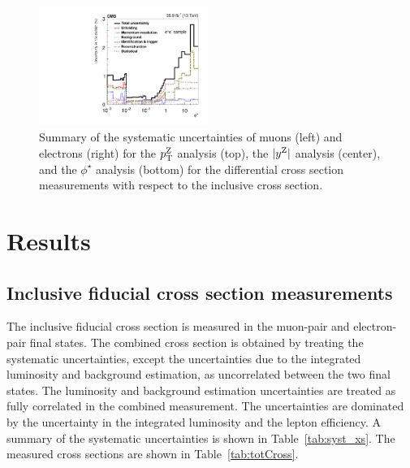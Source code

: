 \begin{figure}
        \includegraphics[width=0.49\textwidth]{figures/zpt/histoUnfolding_XSRatioSystPhiStar_nsel1_dy3.pdf}
	\caption{Summary of the systematic uncertainties of muons (left) and electrons (right) 
	for the $p_{\mathrm{T}}^{\mathrm{Z}}$ analysis (top), the $|y^{\mathrm{Z}}|$ analysis (center), and the $\phi^\star$ analysis (bottom) 
	for the differential cross section measurements with respect to the inclusive cross section.}
	\label{fig:zpt_syst_xratio}
\end{figure}

\section{Results}
\subsection{Inclusive fiducial cross section measurements}
The inclusive fiducial cross section is measured in the muon-pair and 
electron-pair final states. The combined cross section is obtained by treating 
the systematic uncertainties, except the uncertainties due to the integrated 
luminosity and background estimation, as uncorrelated between the two final states. The luminosity and background estimation uncertainties are treated as fully correlated in the combined measurement. The uncertainties are dominated by the uncertainty in the integrated luminosity and the lepton  efficiency. A summary of the systematic uncertainties is shown in Table~\ref{tab:syst_xs}. The measured cross sections are shown in 
Table~\ref{tab:totCross}. 

